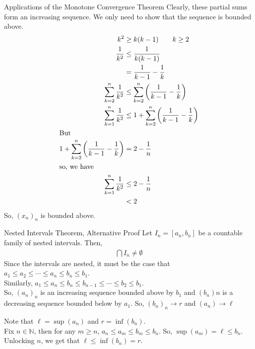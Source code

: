 \documentclass[8pt]{extarticle}
\newcommand{\N}{\mathbb{N}}
\begin{document}
\begin{problem}{Applications of the Monotone Convergence Theorem}
    Clearly, these partial sums form an increasing sequence. We only need to show that the sequence is bounded above.
    \begin{align*}
      k^2 &\geq k(k-1)\tag*{$k\geq 2$}\\
      \frac{1}{k^2} &\leq \frac{1}{k(k-1)}\\
                    &= \frac{1}{k-1}-\frac{1}{k}\\
      \sum_{k=2}^{n} \frac{1}{k^2} &\leq \sum_{k=2}^{n} \left(\frac{1}{k-1}-\frac{1}{k}\right)\\
      \sum_{k=1}^{n} \frac{1}{k^2} &\leq 1 + \sum_{k=2}^{n} \left(\frac{1}{k-1}-\frac{1}{k}\right)\\
      \shortintertext{But}
      1 + \sum_{k=2}^{n} \left(\frac{1}{k-1}-\frac{1}{k}\right) &= 2 - \frac{1}{n}\\
      \shortintertext{so, we have}
      \sum_{k=1}^{n} \frac{1}{k^2} &\leq 2-\frac{1}{n}\\
                                   &< 2
    \end{align*}
    So, $(x_n)_n$ is bounded above.
  \end{problem}
  \begin{problem}{Nested Intervals Theorem, Alternative Proof}
    Let $I_n = [a_n,b_n]$ be a countable family of nested intervals. Then,
    \begin{align*}
      \bigcap I_n \neq \emptyset
    \end{align*}
    \tcblower
    Since the intervals are nested, it must be the case that $a_{1} \leq a_2 \leq \cdots \leq a_{n} \leq b_{n} \leq b_{1}$.\\

    Similarly, $a_1 \leq a_{n} \leq b_{n} \leq b_{n-1} \leq \cdots \leq b_{2} \leq b_{1}$.\\

    So, $\left(a_n\right)_n$ is an increasing sequence bounded above by $b_{1}$ and $\left(b_n\right)n$ is a decreasing sequence bounded below by $a_{1}$. So, $\left(b_n\right)_n \rightarrow r$ and $\left(a_n\right)\rightarrow \ell$

    Note that $\ell = \sup(a_n)$ and $r = \inf(b_n)$.\\

    Fix $n\in\N$, then for any $m \geq n$, $a_{n} \leq a_{m} \leq b_{m} \leq b_{n}$. So, $\sup(a_m) = \ell \leq b_{n}$. Unlocking $n$, we get that $\ell \leq \inf(b_n) = r$.
  \end{problem}
\end{document}
